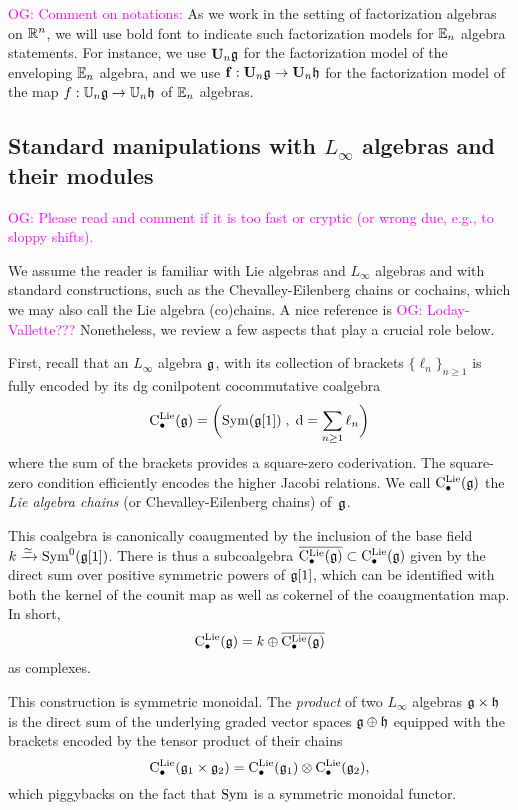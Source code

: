 \documentclass[11pt]{amsart}
\numberwithin{equation}{section}
\def\owen{\textcolor{magenta}{OG: }\textcolor{magenta}}
\begin{document}
\owen{Comment on notations:}
As we work in the setting of factorization algebras on $\mathbb R^n$, 
we will use bold font to indicate such factorization models for $\mathbb E_n$ algebra statements.
For instance, we use $\mathbf U_n \mathfrak g$ for the factorization model of the enveloping $\mathbb E_n$ algebra,
and we use ${\bf f}: \mathbf U_n \mathfrak g \to \mathbf U_n \mathfrak h$ for the factorization model of the map $f: \mathbb U_n \mathfrak g \to \mathbb U_n \mathfrak h$ of $\mathbb E_n$ algebras.

\subsection{Standard manipulations with $L_\infty$ algebras and their modules}
\label{sec: review of linfty}

\owen{Please read and comment if it is too fast or cryptic (or wrong due, e.g., to sloppy shifts).}

We assume the reader is familiar with Lie algebras and $L_\infty$ algebras and with standard constructions,
such as the Chevalley-Eilenberg chains or cochains, which we may also call the Lie algebra (co)chains.
A nice reference is \owen{Loday-Vallette???}
Nonetheless, we review a few aspects that play a crucial role below.

First, recall that an $L_\infty$ algebra $\mathfrak g$, with its collection of brackets $\{\ell_n\}_{n \geq 1}$ is fully encoded by its dg conilpotent cocommutative coalgebra
\[
{\rm C}^{\rm Lie}_\bullet(\mathfrak g) = \bigg({\rm Sym}(\mathfrak g[1]) \; , \; {\rm d} = \sum_{n \geq 1} \ell_n\bigg)
\]
where the sum of the brackets provides a square-zero coderivation.
The square-zero condition efficiently encodes the higher Jacobi relations.
We call ${\rm C}^{\rm Lie}_\bullet(\mathfrak g)$ the {\em Lie algebra chains} (or Chevalley-Eilenberg chains) of~$\mathfrak g$.

This coalgebra is canonically coaugmented by the inclusion of the base field $k \xrightarrow{\simeq} {\rm Sym}^0(\mathfrak g[1])$.
There is thus a subcoalgebra $\overline{{\rm C}^{\rm Lie}_\bullet(\mathfrak g)} \subset {\rm C}^{\rm Lie}_\bullet(\mathfrak g)$ given by the direct sum over positive symmetric powers of $\mathfrak g[1]$,
which can be identified with both the kernel of the counit map as well as cokernel of the coaugmentation map.
In short,
\[
{\rm C}^{\rm Lie}_\bullet(\mathfrak g) = k \oplus \overline{{\rm C}^{\rm Lie}_\bullet(\mathfrak g)}
\]
as complexes.

This construction is symmetric monoidal.
The {\em product} of two $L_\infty$ algebras $\mathfrak g \times \mathfrak h$ is the direct sum of the underlying graded vector spaces $\mathfrak g \oplus \mathfrak h$ equipped with the brackets encoded by the tensor product of their chains
\[
{\rm C}^{\rm Lie}_\bullet(\mathfrak g_1 \times \mathfrak g_2) = {\rm C}^{\rm Lie}_\bullet(\mathfrak g_1) \otimes {\rm C}^{\rm Lie}_\bullet(\mathfrak g_2),
\]
which piggybacks on the fact that ${\rm Sym}$ is a symmetric monoidal functor.
\end{document}
